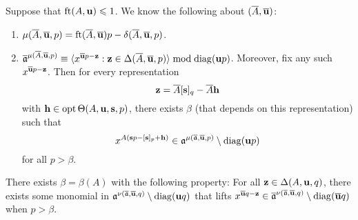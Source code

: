 \documentclass[11pt]{amsart}
\begin{document}
Suppose that $\operatorname{ft}(A, \mathbf{u}) \leqslant 1$.  
We know the following about $(\overline{A}, \overline{\mathbf{u}})$:
\begin{enumerate}
 \item $\mu(\overline{A}, \overline{\mathbf{u}}, p) = \operatorname{ft}(\overline{A}, \overline{\mathbf{u}}) p - \delta(\overline{A}, \overline{\mathbf{u}},p)$.
 \item $\overline{\mathfrak{a}}^{\mu(\overline{A}, \overline{\mathbf{u}}, p)} \equiv \langle x^{\overline{\mathbf{u}} p - \mathbf{z}} : \mathbf{z} \in \Delta(\overline{A}, \overline{\mathbf{u}}, p) \rangle \bmod \operatorname{diag}(\mathbf{u}p)$.
 Moreover, fix any such $x^{\overline{\mathbf{u}} p - \mathbf{z}}$.  Then for every representation \[\mathbf{z} = \overline{A} [\mathbf{s}]_q - \overline{A} \mathbf{h}
 \]
 with $\mathbf{h} \in \operatorname{opt} \Theta(A, \mathbf{u}, \mathbf{s}, p)$, there exists $\beta$ (that depends on this representation) such that 
 \[
  x^{A(\mathbf{s}p-[\mathbf{s}]_p + \mathbf{h})} \in \mathfrak{a}^{\mu(\overline{\mathfrak{a}}, \overline{\mathbf{u}}, p)} \setminus \operatorname{diag}(\mathbf{u}p)
 \]
 for all $p > \beta$.
\end{enumerate}

\begin{lemma}
There exists $\beta = \beta(A)$ with the following property:  For all $\mathbf{z}\in \Delta(A, \mathbf{u}, q)$, there exists some monomial in $\mathfrak{a}^{\nu(\overline{\mathfrak{a}}, \overline{\mathbf{u}}, q)} \setminus \operatorname{diag}(\mathbf{u}q)$ that lifts $x^{\overline{\mathbf{u}}q-\mathbf{z}} \in \overline{\mathfrak{a}}^{\nu(\overline{\mathfrak{a}}, \overline{\mathbf{u}}, q)} \setminus \operatorname{diag}(\overline{\mathbf{u}}q)$ when $p > \beta$.  
\end{lemma}
\end{document}
